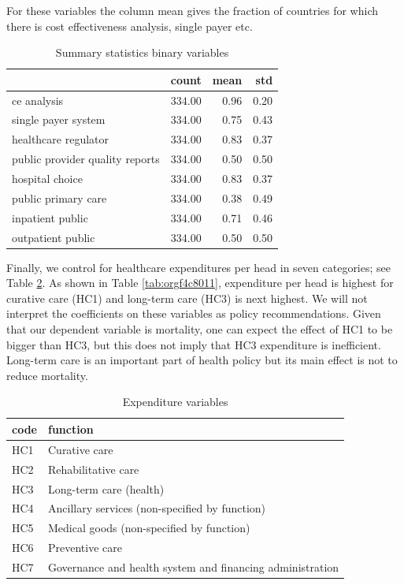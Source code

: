 \documentclass[12pt,english,a4paper]{article}
\begin{document}
For these variables the column mean gives the fraction of countries for which there is cost effectiveness analysis, single payer etc.

\begin{table}[htbp]
\caption{\label{tab:org4cb4a97}Summary statistics binary variables}
\centering
\begin{tabular}{lrrr}
 & count & mean & std\\
\hline
ce analysis & 334.00 & 0.96 & 0.20\\
single payer system & 334.00 & 0.75 & 0.43\\
healthcare regulator & 334.00 & 0.83 & 0.37\\
public provider quality reports & 334.00 & 0.50 & 0.50\\
hospital choice & 334.00 & 0.83 & 0.37\\
public primary care & 334.00 & 0.38 & 0.49\\
inpatient public & 334.00 & 0.71 & 0.46\\
outpatient public & 334.00 & 0.50 & 0.50\\
\end{tabular}
\end{table}


Finally, we control for healthcare expenditures per head in seven categories; see Table \ref{tab:org35aa167}. As shown in Table \ref{tab:orgf4c8011}, expenditure per head is highest for curative care (HC1) and long-term care (HC3) is next highest. We will not interpret the coefficients on these variables as policy recommendations. Given that our dependent variable is mortality, one can expect the effect of HC1 to be bigger than HC3, but this does not imply that HC3 expenditure is inefficient. Long-term care is an important part of health policy but its main effect is not to reduce mortality.

\begin{table}[htbp]
\caption{\label{tab:org35aa167}Expenditure variables}
\centering
\begin{tabular}{ll}
code & function\\
\hline
HC1 & Curative care\\
HC2 & Rehabilitative care\\
HC3 & Long-term care (health)\\
HC4 & Ancillary services (non-specified by function)\\
HC5 & Medical goods (non-specified by function)\\
HC6 & Preventive care\\
HC7 & Governance and health system and financing administration\\
\end{tabular}
\end{table}
\end{document}
